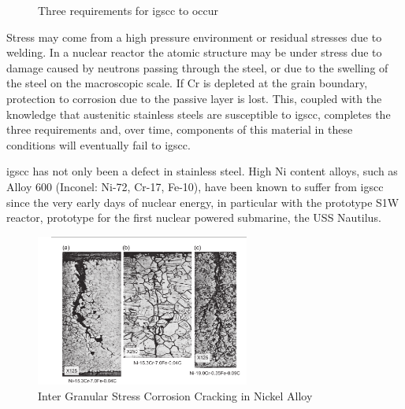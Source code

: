 \begin{figure}
  \begin{center}
\caption{Three requirements for \acrshort{igscc} to occur}
\label{fig:igsccrequirements}
\end{center}
\end{figure}

Stress may come from a high pressure environment or residual stresses due to welding.  In a nuclear reactor the atomic structure may be under stress due to damage caused by neutrons passing through the steel, or due to the swelling of the steel on the macroscopic scale.  If Cr is depleted at the grain boundary, protection to corrosion due to the passive layer is lost.  This, coupled with the knowledge that austenitic stainless steels are susceptible to \acrshort{igscc}, completes the three requirements and, over time, components of this material in these conditions will eventually fail to \acrshort{igscc}.

\acrshort{igscc} has not only been a defect in stainless steel.  High Ni content alloys, such as Alloy 600 (Inconel:  Ni-72, Cr-17, Fe-10),  have been known to suffer from \acrshort{igscc} since the very early days of nuclear energy, in particular with the prototype S1W reactor, prototype for the first nuclear powered submarine, the USS Nautilus.

\begin{figure}
  \begin{center}
    \includegraphics[width=7.0cm]{chapters/austenitic_steels_in_nuclear/images/igscc_nickel_alloy600.png}
    \caption{Inter Granular Stress Corrosion Cracking in Nickel Alloy\cite{staehlecoriou}}
    \label{image:igsccni}
  \end{center}
\end{figure}


